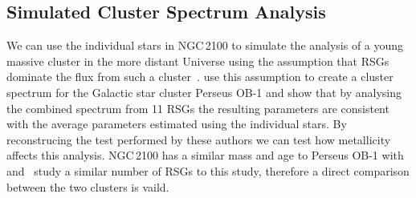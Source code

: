 \documentclass[useAMS,usenatbib]{mn2e}
\def\kms{$\mbox{km s}^{-1}$}
\begin{document}







\subsection{Simulated Cluster Spectrum Analysis} %
\label{sub:integrated_light_cluster_analysis}

We can use the individual stars in NGC\,2100 to simulate the analysis of a young massive cluster in the more distant Universe using the assumption that RSGs dominate the flux from such a cluster~\citep{2013MNRAS.430L..35G}.
\cite{2014ApJ...788...58G} use this assumption to create a cluster spectrum for the Galactic star cluster Perseus OB-1 and show that by analysing the combined spectrum from 11 RSGs the resulting parameters are consistent with the average parameters estimated using the individual stars.
By reconstrucing the test performed by these authors we can test how metallicity affects this analysis.
NGC\,2100 has a similar mass and age to Perseus OB-1 with and~\citep{2014ApJ...788...58G} study a similar number of RSGs to this study,
therefore a direct comparison between the two clusters is vaild.
\end{document}
